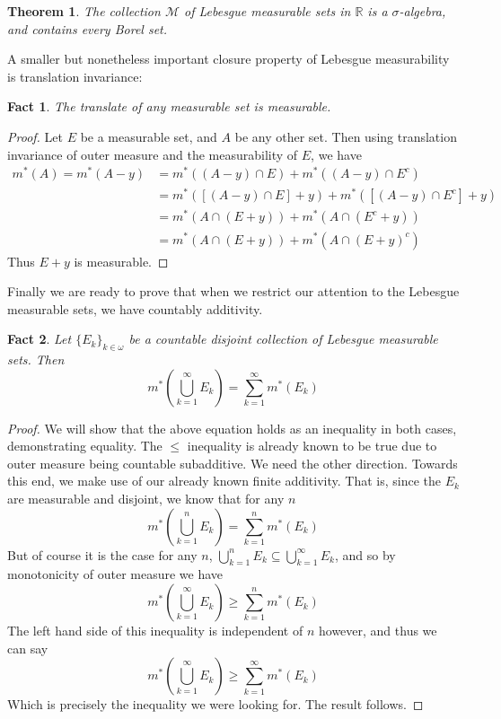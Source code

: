 \documentclass{article}
\theoremstyle{definition}
\theoremstyle{plain}
\theoremstyle{theorem}
\newtheorem{fact}{Fact}[section]
\newtheorem{theorem}{Theorem}[section]
\begin{document}
\begin{theorem}
	The collection $\mathcal{M}$ of Lebesgue measurable sets in $\mathbb{R}$ is a $\sigma$-algebra, and contains every Borel set. 
\end{theorem}  
A smaller but nonetheless important closure property of Lebesgue measurability is translation invariance:
\begin{fact}
	The translate of any measurable set is measurable.
\end{fact}
\begin{proof}
	Let $E$ be a measurable set, and $A$ be any other set. Then using translation invariance of outer measure and the measurability of $E$, we have 
	\begin{align*}
		m^*(A) = m^*(A-y) &= m^*((A-y)\cap E) + m^*((A-y)\cap E^c) \\
						&= m^*([(A-y)\cap E]+y)+m^*([(A-y)\cap E^c]+y) \\
						&= m^*(A \cap (E+y)) + m^*(A \cap (E^c+y)) \\
						&= m^*(A \cap (E+y)) + m^*(A \cap (E+y)^c)
	\end{align*}
	Thus $E+y$ is measurable.
\end{proof}
Finally we are ready to prove that when we restrict our attention to the Lebesgue measurable sets, we have countably additivity.
\begin{fact}
	Let $\{E_k\}_{k \in \omega}$ be a countable disjoint collection of Lebesgue measurable sets. Then 
	\[ m^*\left( \bigcup_{k=1}^{\infty} E_k \right) = \sum_{k=1}^{\infty} m^*(E_k) \]
\end{fact}
\begin{proof}
	We will show that the above equation holds as an inequality in both cases, demonstrating equality. The $\leq$ inequality is already known to be true due to outer measure being countable subadditive. We need the other direction. Towards this end, we make use of our already known finite additivity. That is, since the $E_k$ are measurable and disjoint, we know that for any $n$
	\[ m^*\left(\bigcup_{k=1}^n E_k \right) = \sum_{k=1}^n m^*(E_k) \]
But of course it is the case for any $n$, $\bigcup_{k=1}^n E_k \subseteq \bigcup_{k=1}^{\infty} E_k$, and so by monotonicity of outer measure we have
\[ m^*\left(\bigcup_{k=1}^{\infty} E_k \right) \geq \sum_{k=1}^n m^*(E_k) \]
The left hand side of this inequality is independent of $n$ however, and thus we can say
\[ m^*\left(\bigcup_{k=1}^{\infty} E_k \right) \geq \sum_{k=1}^{\infty} m^*(E_k)\]
Which is precisely the inequality we were looking for. The result follows. 
\end{proof}
\end{document}
